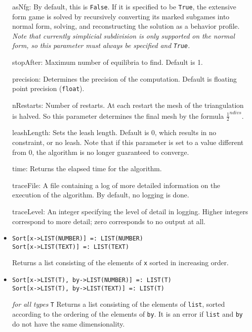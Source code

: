 \begin{itemize}
\bd
\item
[asNfg:] By default, this is \verb+False+.  If it is specified to be
\verb+True+, the extensive form game is solved by recursively converting
its marked subgames into normal form, solving, and reconstructing the
solution as a behavior profile.  {\it Note that currently simplicial
subdivision is only supported on the normal form, so this parameter
must always be specified and {\tt True}.}
\item
[stopAfter:] Maximum number of equilibria to find. Default is 1.  
\item
[precision:] Determines the precision of the computation. Default is
floating point precision (\verb+float+). 
\item 
[nRestarts:] Number of restarts.  At each restart the mesh of the
triangulation is halved.  So this parameter determines the final mesh
by the formula $\frac{1}{2}^{ndivs}$.
\item
[leashLength:] Sets the leash length. Default is 0, which results in no
constraint, or no leash.  Note that if this parameter is set to a value
different from 0, the algorithm is no longer guaranteed to converge.
\item
[time:] Returns the elapsed time for the algorithm.
\item
[traceFile:] A file containing a log of more detailed information on the
execution of the algorithm.  By default, no logging is done.
\item
[traceLevel:] An integer specifying the level of detail in logging.
Higher integers correspond to more detail; zero corresponds to
no output at all.
\ed
\ed

\item{}
\protect \large \begin{verbatim}
Sort[x->LIST(NUMBER)] =: LIST(NUMBER)
Sort[x->LIST(TEXT)] =: LIST(TEXT)
\end{verbatim} \normalsize

\bd
Returns a list consisting of the elements of \verb+x+ sorted in
increasing order.
\ed

\item{}
\protect \large \begin{verbatim}
Sort[x->LIST(T), by->LIST(NUMBER)] =: LIST(T)
Sort[x->LIST(T), by->LIST(TEXT)] =: LIST(T)
\end{verbatim} \normalsize

{\it for all types} {\tt T}
\bd
Returns a list consisting of the elements of \verb+list+, sorted
according to the ordering of the elements of \verb+by+.  It is an
error if \verb+list+ and \verb+by+ do not have the same dimensionality.
\ed


\end{itemize}
